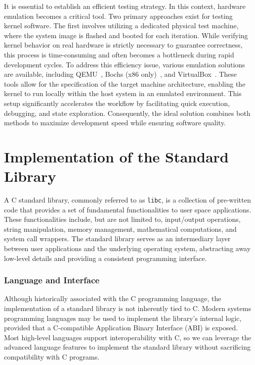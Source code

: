 \documentclass[a4paper,10pt,twoside]{report}
\theoremstyle{definition}
\begin{document}
It is essential to establish an efficient testing strategy. In this context, hardware emulation becomes a critical tool. Two primary approaches exist for testing kernel software. The first involves utilizing a dedicated physical test machine, where the system image is flashed and booted for each iteration. While verifying kernel behavior on real hardware is strictly necessary to guarantee correctness, this process is time-consuming and often becomes a bottleneck during rapid development cycles. To address this efficiency issue, various emulation solutions are available, including QEMU~\cite{qemu_website}, Bochs (x86 only)~\cite{bochs_website}, and VirtualBox~\cite{virtualbox_website}. These tools allow for the specification of the target machine architecture, enabling the kernel to run locally within the host system in an emulated environment. This setup significantly accelerates the workflow by facilitating quick execution, debugging, and state exploration. Consequently, the ideal solution combines both methods to maximize development speed while ensuring software quality.


\section{Implementation of the Standard Library}
\label{subsec:theory_std}

A C standard library, commonly referred to as \texttt{libc}, is a collection of pre-written code that provides a set of fundamental functionalities to user space applications. These functionalities include, but are not limited to, input/output operations, string manipulation, memory management, mathematical computations, and system call wrappers. The standard library serves as an intermediary layer between user applications and the underlying operating system, abstracting away low-level details and providing a consistent programming interface.

\subsubsection{Language and Interface}

Although historically associated with the C programming language, the implementation of a standard library is not inherently tied to C. Modern systems programming languages may be used to implement the library's internal logic, provided that a C-compatible Application Binary Interface (ABI) is exposed. Most high-level languages support interoperability with C, so we can leverage the advanced language features to implement the standard library without sacrificing compatibility with C programs.
\end{document}

